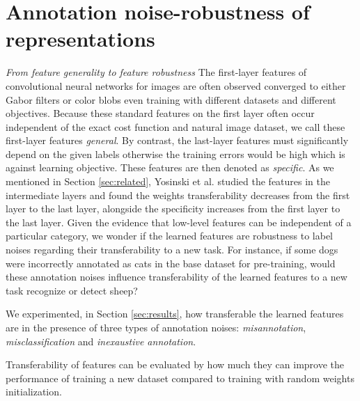 \section{Annotation noise-robustness of representations}
\label{sec:robustness}


\noindent
\textit{From feature generality to feature robustness}
\noindent
The first-layer features of convolutional neural networks for images are often observed converged to either Gabor filters or color blobs even training with different datasets and different objectives\cite{zeiler2014visualizing,lee2009convolutional,krizhevsky2012imagenet,shin2016deep}.
Because these standard features on the first layer often occur independent of the exact cost function and natural image dataset, we call these first-layer features \textit{general}.
By contrast, the last-layer features must significantly depend on the given labels otherwise the training errors would be high which is against learning objective.
These features are then denoted as \textit{specific}.
As we mentioned in Section \ref{sec:related}, Yosinski et al. \cite{yosinski2014transferable} studied the features in the intermediate layers and found the weights transferability decreases from the first layer to the last layer, alongside the specificity increases from the first layer to the last layer.
Given the evidence that low-level features can be independent of a particular category, we wonder if the learned features are robustness to label noises regarding their transferability to a new task.
For instance, if some dogs were incorrectly annotated as cats in the base dataset for pre-training, would these annotation noises influence transferability of the learned features to a new task recognize or detect sheep?

\noindent
We experimented, in Section \ref{sec:results}, how transferable the learned features are in the presence of three types of annotation noises: \textit{misannotation}, \textit{misclassification} and \textit{inexaustive annotation}.

Transferability of features can be evaluated by how much they can improve the performance of training a new dataset compared to training with random weights initialization. \cite{yosinski2014transferable}

\noindent
